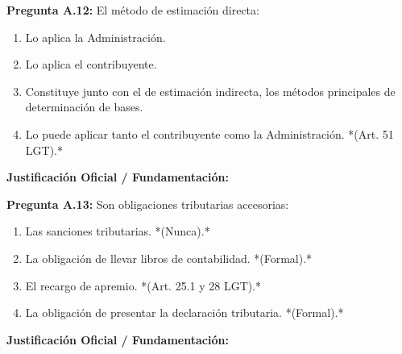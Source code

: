 \documentclass[11pt,a4paper,openany]{article}
\begin{document}
\noindent\textbf{\sffamily Pregunta A.12:} El método de estimación directa:\\[0.15cm]
\begin{enumerate}[label=\textbf{\alph*)},leftmargin=1.8em,itemsep=1.5pt,topsep=2pt,partopsep=0pt,parsep=0pt]
    \item Lo aplica la Administración.
    \item Lo aplica el contribuyente.
    \item Constituye junto con el de estimación indirecta, los métodos principales de determinación de bases.
    \item Lo puede aplicar tanto el contribuyente como la Administración. *(Art. 51 LGT).*
\end{enumerate}
\begin{solucionBox}
\textbf{Justificación Oficial / Fundamentación:}\\[0.1cm]

\end{solucionBox}
\vspace{0.35cm}

\noindent\textbf{\sffamily Pregunta A.13:} Son obligaciones tributarias accesorias:\\[0.15cm]
\begin{enumerate}[label=\textbf{\alph*)},leftmargin=1.8em,itemsep=1.5pt,topsep=2pt,partopsep=0pt,parsep=0pt]
    \item Las sanciones tributarias. *(Nunca).*
    \item La obligación de llevar libros de contabilidad. *(Formal).*
    \item El recargo de apremio. *(Art. 25.1 y 28 LGT).*
    \item La obligación de presentar la declaración tributaria. *(Formal).*
\end{enumerate}
\begin{solucionBox}
\textbf{Justificación Oficial / Fundamentación:}\\[0.1cm]

\end{solucionBox}
\vspace{0.35cm}
\end{document}
